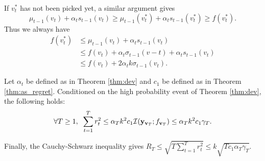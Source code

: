 If $v^*_t$ has not been picked yet, a similar argument gives 
\begin{equation*}
	\mu_{t-1}(v_t) + \alpha_t s_{t-1}(v_t) \geq \mu_{t-1}(v^*_{t}) + \alpha_t s_{t-1}(v^*_{t}) 
	\geq f(v^*_t).
\end{equation*}
Thus we always have 
\begin{align*}
f(v^*_t) &\leq \mu_{t-1}(v_t) + \alpha_t s_{t-1}(v_t) \\
&\leq f(v_t) + \alpha_t \sigma_{t-1}(v-t) +\alpha_t s_{t-1}(v_t)\\
&\leq f(v_t) + 2 \alpha_t k \sigma_{t-1}(v_t).	
\end{align*}
\begin{lemma}
	Let $\alpha_t$ be defined as in Theorem \ref{thm:dev} and $c_1$ be defined as in Theorem \ref{thm:as_regret}.
	Conditioned on the high probability event of Theorem \ref{thm:dev}, the following holds:
	\begin{equation*}
	\forall T\geq 1, \;\;\sum_{t=1}^T r_t^2 \leq \alpha_T k^2 c_1 \mathcal{I}(\mathbf y_{\mathbf{v}_T};f_{\mathbf{v}_T}) \leq \alpha_T k^2 c_1 \gamma_T.	
	\end{equation*}
\end{lemma}
Finally, the Cauchy-Schwarz inequality gives  
$R_T \leq \sqrt{T \sum_{t=1}^T r_t^2} \leq k \sqrt{T c_1 \alpha_T \gamma_T}.$
